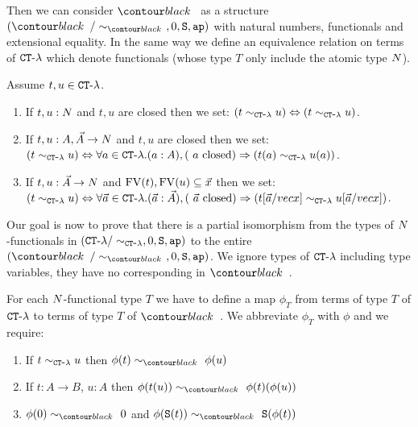 Then we can consider $\systemT$ as a structure $(\systemT/\sim_{\systemT}, 0, \Succ, \ap)$
with natural numbers, functionals and extensional equality. 
In the same way we define an equivalence relation on terms of ${ {\tt CT} \mbox{-} \lambda}$ which denote functionals
(whose type $T$ only include the atomic type ${N}$). 


\begin{definition}
Assume $t,u \in { {\tt CT} \mbox{-} \lambda}$.
\begin{enumerate}
\item
If $t,u:{N}$ and $t,u$ are closed then we set: 
$(t \sim_{{ {\tt CT} \mbox{-} \lambda}} u) \Leftrightarrow  (t \sim_{{ {\tt CT} \mbox{-} \lambda}} u)$.
\item
If $t,u:A,\vec{A}\rightarrow{N}$ and $t,u$ are closed then we set: 
$(t \sim_{{ {\tt CT} \mbox{-} \lambda}} u) \Leftrightarrow  
\forall a \in { {\tt CT} \mbox{-} \lambda}. (a:A), (\mbox{ $a$ closed}) \Rightarrow (t(a) \sim_{{ {\tt CT} \mbox{-} \lambda}} u(a))$.
\item
If $t,u:\vec{A}\rightarrow{N}$ and ${{\rm FV}}(t), {{\rm FV}}(u) \subseteq \vec{x}$ then we set:
$(t \sim_{{ {\tt CT} \mbox{-} \lambda}} u) 
\Leftrightarrow  
\forall \vec{a} \in { {\tt CT} \mbox{-} \lambda}. 
(\vec{a}:\vec{A}), (\mbox{ $\vec{a}$ closed})  \Rightarrow (t[\vec{a}/vec{x}] \sim_{{ {\tt CT} \mbox{-} \lambda}} u[\vec{a}/vec{x}])$.
\end{enumerate}
\end{definition}

Our goal is now to prove that there is a partial isomorphism from the types of ${N}$-functionals in 
$({ {\tt CT} \mbox{-} \lambda}/\sim_{{ {\tt CT} \mbox{-} \lambda}}, 0, {\tt S}, {\tt ap})$ to the entire
$(\systemT/\sim_{\systemT}, 0, \Succ, \ap)$.
We ignore types of ${ {\tt CT} \mbox{-} \lambda}$ including type variables, they have no corresponding in $\systemT$.

For each ${N}$-functional type $T$ we have to define a map $\phi_T$ from terms of type $T$ of ${ {\tt CT} \mbox{-} \lambda}$
to terms of type $T$ of $\systemT$. We abbreviate $\phi_T$ with $\phi$ and we require:

\begin{enumerate}
\item
If $t \sim_{{ {\tt CT} \mbox{-} \lambda}} u$ then $\phi(t) \sim_{\systemT} \phi(u)$

\item
If $t: A \rightarrow B$, $u:A$ then $\phi(t(u)) \sim_{\systemT} \phi(t)(\phi(u))$

\item
$\phi(0) \sim_{\systemT} 0$ and
$\phi(\Succ(t)) \sim_{\systemT} \Succ(\phi(t))$

\end{enumerate}

